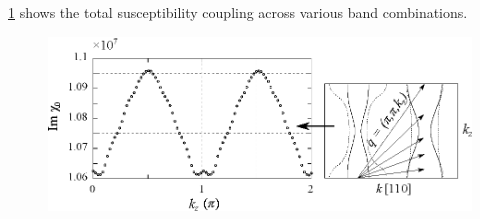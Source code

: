 \Fig\ref{Fig:ResD:FullSusceptibility} shows the total susceptibility coupling across various band combinations.

\begin{figure}[htbp]
    \begin{center}
        \includegraphics[scale=0.9]{Chapter-dHvABaFe2P2/Figures/Susceptibility/NestingVector/NestingVector}
        \caption{}
        \label{Fig:ResD:FullSusceptibility}
    \end{center}
\end{figure}


